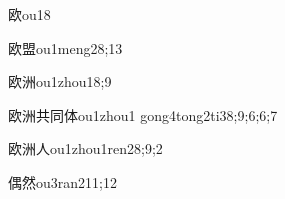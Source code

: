 
\begin{verbete}{欧}{ou1}{8}
\end{verbete}

\begin{verbete}{欧盟}{ou1meng2}{8;13}
\end{verbete}

\begin{verbete}{欧洲}{ou1zhou1}{8;9}
\end{verbete}

\begin{verbete}{欧洲共同体}{ou1zhou1 gong4tong2ti3}{8;9;6;6;7}
\end{verbete}

\begin{verbete}{欧洲人}{ou1zhou1ren2}{8;9;2}
\end{verbete}

\begin{verbete}{偶然}{ou3ran2}{11;12}
\end{verbete}

